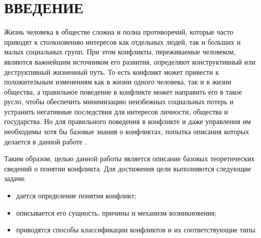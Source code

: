\chapter*{ВВЕДЕНИЕ}

Жизнь человека в обществе сложна и полна противоречий, которые часто приводят к
столкновению интересов как отдельных людей, так и больших и малых социальных
групп. При этом конфликты, переживаемые человеком, являются важнейшим источником
его развития, определяют конструктивный или деструктивный жизненный путь. То
есть конфликт может привести к положительным изменениям как в жизни одного
человека, так и в жизни общества, а правильное поведение в конфликте может
направить его в такое русло, чтобы обеспечить минимизацию неизбежных социальных
потерь и устранить негативные последствия для интересов личности, общества и
государства. Но для правильного поведения в конфликте и даже управления им
необходимы хотя бы базовые знания о конфликтах, попытка описания которых
делается в данной работе \cite{book01,book02}.

Таким образом, целью данной работы является описание базовых теоретических
сведений о понятии конфликта. Для достижения цели выполняются следующие задачи:
\begin{itemize}
    \item дается определение понятия конфликт;
    \item описывается его сущность, причины и механизм возникновения;
    \item приводятся способы классификации конфликтов и их соответствующие типы.
\end{itemize}
